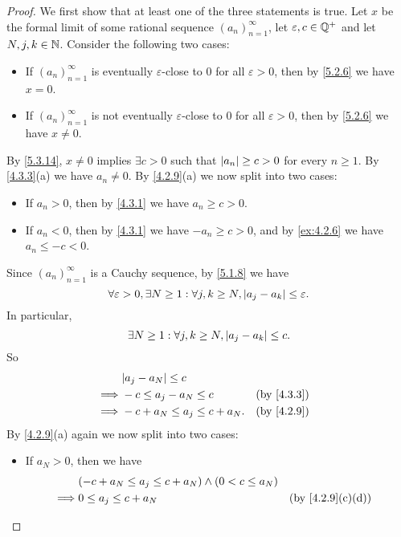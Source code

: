 \begin{proof}
	We first show that at least one of the three statements is true.
	Let \(x\) be the formal limit of some rational sequence \((a_n)_{n = 1}^{\infty}\), let \(\varepsilon, c \in \mathbb{Q}^+\) and let \(N, j, k \in \mathbb{N}\).
	Consider the following two cases:
	\begin{itemize}
		\item If \((a_n)_{n = 1}^{\infty}\) is eventually \(\varepsilon\)-close to \(0\) for all \(\varepsilon > 0\), then by \cref{5.2.6} we have \(x = 0\).
		\item If \((a_n)_{n = 1}^{\infty}\) is not eventually \(\varepsilon\)-close to \(0\) for all \(\varepsilon > 0\), then by \cref{5.2.6} we have \(x \neq 0\).
	\end{itemize}
	By \cref{5.3.14}, \(x \neq 0\) implies \(\exists c > 0\) such that \(\left\lvert a_n\right\rvert \geq c > 0\) for every \(n \geq 1\).
	By \cref{4.3.3}(a) we have \(a_n \neq 0\).
	By \cref{4.2.9}(a) we now split into two cases:
	\begin{itemize}
		\item If \(a_n > 0\), then by \cref{4.3.1} we have \(a_n \geq c > 0\).
		\item If \(a_n < 0\), then by \cref{4.3.1} we have \(-a_n \geq c > 0\), and by \cref{ex:4.2.6} we have \(a_n \leq -c < 0\).
	\end{itemize}
	Since \((a_n)_{n = 1}^{\infty}\) is a Cauchy sequence, by \cref{5.1.8} we have
	\[
		\forall \varepsilon > 0, \exists N \geq 1 : \forall j, k \geq N, \left\lvert a_j - a_k\right\rvert \leq \varepsilon.
	\]
	In particular,
	\[
		\exists N \geq 1 : \forall j, k \geq N, \left\lvert a_j - a_k\right\rvert \leq c.
	\]
	So
	\begin{align*}
		         & \abs{a_j - a_N} \leq c                          \\
		\implies & -c \leq a_j - a_N \leq c        &  & \by{4.3.3} \\
		\implies & -c + a_N \leq a_j \leq c + a_N. &  & \by{4.2.9} \\
	\end{align*}
	By \cref{4.2.9}(a) again we now split into two cases:
	\begin{itemize}
		\item If \(a_N > 0\), then we have
		      \begin{align*}
			               & (-c + a_N \leq a_j \leq c + a_N) \land (0 < c \leq a_N)                                               \\
			      \implies & 0 \leq a_j \leq c + a_N                                 &            & \text{(by \cref{4.2.9}(c)(d))} \\

\end{align*}
\end{itemize}
\end{proof}

